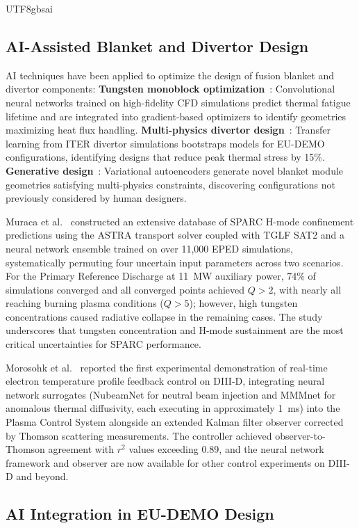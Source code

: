 \documentclass[12pt,a4paper]{article}
\begin{document}
\begin{CJK}{UTF8}{gbsai}
\subsection{AI-Assisted Blanket and Divertor Design}

AI techniques have been applied to optimize the design of fusion blanket and divertor components: \textbf{Tungsten monoblock optimization}~\citep{Merola2024}: Convolutional neural networks trained on high-fidelity CFD simulations predict thermal fatigue lifetime and are integrated into gradient-based optimizers to identify geometries maximizing heat flux handling. \textbf{Multi-physics divertor design}~\citep{You2024}: Transfer learning from ITER divertor simulations bootstraps models for EU-DEMO configurations, identifying designs that reduce peak thermal stress by 15\%. \textbf{Generative design}~\citep{Ihli2024}: Variational autoencoders generate novel blanket module geometries satisfying multi-physics constraints, discovering configurations not previously considered by human designers.

Muraca et al.~\citep{Muraca2025} constructed an extensive database of SPARC H-mode confinement predictions using the ASTRA transport solver coupled with TGLF SAT2 and a neural network ensemble trained on over 11,000 EPED simulations, systematically permuting four uncertain input parameters across two scenarios. For the Primary Reference Discharge at 11~MW auxiliary power, 74\% of simulations converged and all converged points achieved $Q > 2$, with nearly all reaching burning plasma conditions ($Q > 5$); however, high tungsten concentrations caused radiative collapse in the remaining cases. The study underscores that tungsten concentration and H-mode sustainment are the most critical uncertainties for SPARC performance.

Morosohk et al.~\citep{Morosohk2025} reported the first experimental demonstration of real-time electron temperature profile feedback control on DIII-D, integrating neural network surrogates (NubeamNet for neutral beam injection and MMMnet for anomalous thermal diffusivity, each executing in approximately 1~ms) into the Plasma Control System alongside an extended Kalman filter observer corrected by Thomson scattering measurements. The controller achieved observer-to-Thomson agreement with $r^2$ values exceeding 0.89, and the neural network framework and observer are now available for other control experiments on DIII-D and beyond.

\subsection{AI Integration in EU-DEMO Design}


\end{CJK}
\end{document}
